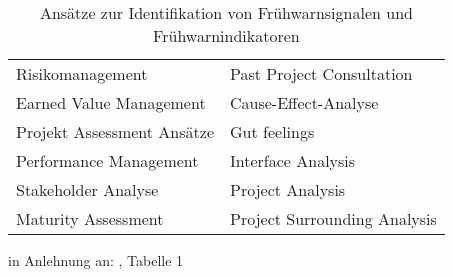 \begin{table}[H]
	\centering
	\begin{threeparttable}
		\caption{Ansätze zur Identifikation von Frühwarnsignalen und Frühwarnindikatoren}
		\begin{tabular}{l|l}
			\toprule
			Risikomanagement & Past Project Consultation\\
			Earned Value Management & Cause-Effect-Analyse\\
			Projekt Assessment Ansätze & Gut feelings \\
			Performance Management & Interface Analysis\\
			Stakeholder Analyse & Project Analysis \\
			Maturity Assessment & Project Surrounding Analysis\\
			\bottomrule
		\end{tabular}
		\begin{tablenotes}
			\small
			\item in Anlehnung an: \citealp{haan13}, Tabelle 1
		\end{tablenotes}
	\label{tab:Ans}
	\end{threeparttable}
\end{table}
